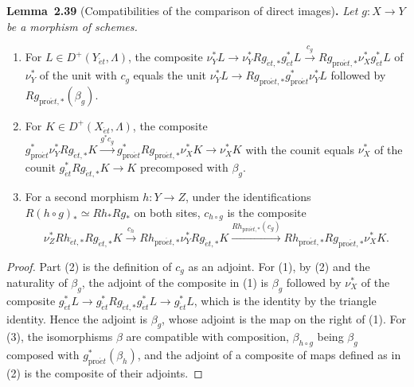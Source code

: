 \documentclass[11pt]{article}
\newenvironment{bpstatement}[2]{\par\addvspace{0.6\baselineskip}\noindent\textbf{#1}#2\textbf{.}\enspace\ignorespaces}
  {\par\addvspace{0.4\baselineskip}}
\newenvironment{bpstatementit}[2]{\begin{bpstatement}{#1}{#2}\itshape\ignorespaces}{\end{bpstatement}}
\begin{document}
\label{bp114}%
\begin{bpstatementit}{Lemma~2.39}{ (Compatibilities of the comparison of direct images)}
Let \(g:X\to Y\) be a morphism of schemes.

\begin{enumerate}
\item For \(L\in D^+(Y_{\acute{e}t},\Lambda)\), the composite \(\nu_Y^*L\to\nu_Y^*Rg_{\acute{e}t,*}g_{\acute{e}t}^*L\xrightarrow{c_g}
  Rg_{\mathrm{pro}\acute{e}t,*}\nu_X^*g_{\acute{e}t}^*L\) of \(\nu_Y^*\) of the unit with \(c_g\) equals the unit \(\nu_Y^*L\to Rg_{\mathrm{pro}\acute{e}t,*}g_{\mathrm{pro}\acute{e}t}^*\nu_Y^*L\) followed by \(Rg_{\mathrm{pro}\acute{e}t,*}(\beta_g)\).
\item For \(K\in D^+(X_{\acute{e}t},\Lambda)\), the composite \(g_{\mathrm{pro}\acute{e}t}^*\nu_Y^*Rg_{\acute{e}t,*}K\xrightarrow{g^*c_g}
  g_{\mathrm{pro}\acute{e}t}^*Rg_{\mathrm{pro}\acute{e}t,*}\nu_X^*K\to\nu_X^*K\) with the counit equals \(\nu_X^*\) of the counit \(g_{\acute{e}t}^*Rg_{\acute{e}t,*}K\to K\) precomposed with \(\beta_g\).
\item For a second morphism \(h:Y\to Z\), under the identifications \(R(h\circ g)_*\simeq Rh_*Rg_*\) on both sites, \(c_{h\circ g}\) is the composite \[
   \nu_Z^*Rh_{\acute{e}t,*}Rg_{\acute{e}t,*}K\xrightarrow{c_h}
   Rh_{\mathrm{pro}\acute{e}t,*}\nu_Y^*Rg_{\acute{e}t,*}K\xrightarrow{Rh_{\mathrm{pro}\acute{e}t,*}(c_g)}
   Rh_{\mathrm{pro}\acute{e}t,*}Rg_{\mathrm{pro}\acute{e}t,*}\nu_X^*K .
   \]
\end{enumerate}
\end{bpstatementit}

\begin{proof}[{Proof}]\label{bp115}%
Part (2) is the definition of \(c_g\) as an adjoint. For (1), by (2) and the naturality of \(\beta_g\), the adjoint of the composite in (1) is \(\beta_g\) followed by \(\nu_X^*\) of the composite \(g^*_{\acute{e}t}L\to g^*_{\acute{e}t}Rg_{\acute{e}t,*}g^*_{\acute{e}t}L\to g^*_{\acute{e}t}L\), which is the identity by the triangle identity. Hence the adjoint is \(\beta_g\), whose adjoint is the map on the right of (1). For (3), the isomorphisms \(\beta\) are compatible with composition, \(\beta_{h\circ g}\) being \(\beta_g\) composed with \(g_{\mathrm{pro}\acute{e}t}^*(\beta_h)\), and the adjoint of a composite of maps defined as in (2) is the composite of their adjoints.
\end{proof}
\end{document}
